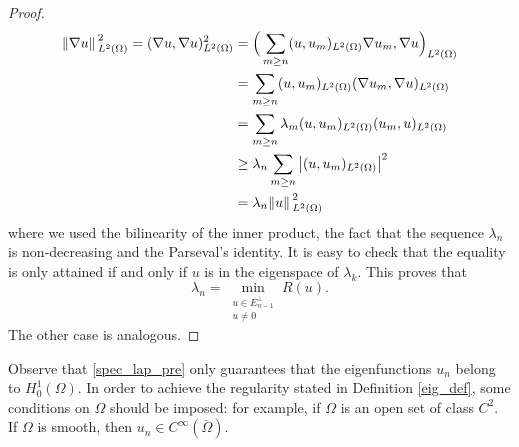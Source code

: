 \begin{proof}
    \begin{align*}
        \norm*{\nabla u}_{L^2(\Omega)}^2 = (\nabla u, \nabla u)_{L^2(\Omega)}^2 &= \Big(\sum_{m\geq n} (u, u_m)_{L^2(\Omega)} \nabla u_m, \nabla u \Big)_{L^2(\Omega)}\\
        &=\sum_{m\geq n} (u, u_m)_{L^2(\Omega)} (\nabla u_m, \nabla u)_{L^2(\Omega)}\\
        &=\sum_{m\geq n} \lambda_m (u, u_m)_{L^2(\Omega)} (u_m, u)_{L^2(\Omega)}\\
        & \geq \lambda_n \sum_{m\geq n} \abs{(u, u_m)_{L^2(\Omega)}}^2\\
        &= \lambda_n \norm*{u}_{L^2(\Omega)}^2
    \end{align*}
    where we used the bilinearity of the inner product, the fact that the sequence \(\lambda_n\) is non-decreasing and the Parseval's identity. It is easy to check that the equality is only attained if and only if \(u\) is in the eigenspace of \(\lambda_k\). This proves that
    \[
        \lambda_n = \min_{\substack{u \in E^\perp_{n-1} \\ u \neq 0}} R(u). 
    \]
    The other case is analogous.
\end{proof}
\begin{remark}
    Observe that \eqref{spec_lap_pre} only guarantees that the eigenfunctions \(u_n\) belong to \(H^1_0(\Omega)\). In order to achieve the regularity stated in Definition \eqref{eig_def}, some conditions on \(\Omega\) should be imposed: for example, if \(\Omega\) is an open set of class \(C^2\). If \(\Omega\) is smooth, then \(u_n \in C^\infty(\overline{\Omega})\).
\end{remark}

